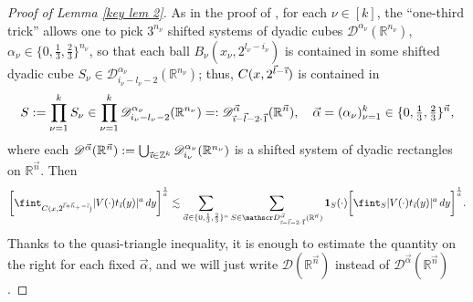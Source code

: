 \documentclass[11pt, reqno]{amsart}
\theoremstyle{definition}
\theoremstyle{remark}
\numberwithin{equation}{section}
\newcommand{\D}{\mathscr D}
\newcommand{\R}{\mathbb R}
\newcommand{\Z}{\mathbb Z}
\newcommand{\vone}{\vec 1}
\newcommand{\val}{\vec\alpha}
\newcommand{\vh}{\vec h}
\newcommand{\vi}{\vec{\textit{\i}}}
\newcommand{\vn}{\vec n}
\newcommand{\vl}{\vec l}
\newcommand{\one}{\mathbf{1}}
\newcommand{\abs}[1]{|#1|}
\begin{document}
\begin{proof}[Proof of Lemma \ref{key lem 2}]
As in the proof of \cite[Lemma 8.5]{BHYY:1b}, for each $\nu\in[k]$, the ``one-third trick'' \cite[Lemma 3.2.26]{HNVW1} allows one to pick $3^{n_{\nu}}$ shifted systems of dyadic cubes $\D^{\alpha_\nu}(\R^{n_\nu})$, $\alpha_\nu\in\{0,\frac13,\frac23\}^{n_\nu}$, so that each ball $B_{\nu}(x_\nu,2^{l_{\nu}-i_\nu})$ is contained in some shifted dyadic cube $S_{\nu}\in\D^{\alpha_\nu}_{i_\nu-l_{\nu}-2}(\R^{n_{\nu}})$; thus, $C(x,2^{\vl-\vi})$ is contained in
\begin{equation*}
S:=\prod_{\nu=1}^k S_{\nu}\in\prod_{\nu=1}^k \D^{\alpha_\nu}_{i_\nu-l_{\nu}-2}(\R^{n_{\nu}})
=:\D^{\val}_{\vi-\vl-2\cdot\vone}(\R^{\vn}),\quad
\val=(\alpha_\nu)_{\nu=1}^k\in\{0,\tfrac13,\tfrac23\}^{\vn},
\end{equation*}
where each $\D^{\val}(\R^{\vn}):=\bigcup_{\vi\in\Z^k}\D^{\alpha_\nu}_{i_\nu}(\R^{n_{\nu}})$ is a shifted system of dyadic rectangles on $\R^{\vn}$. Then
\begin{align*}
\bigg[\fint_{C(x,2^{\vl+\vh_+-\vi})}\abs{V(\cdot)t_{\vi}(y)}^a\, dy\bigg]^{\frac1a}
\lesssim\sum_{\val\in\{0,\frac13,\frac23\}^n}\sum_{S\in\D^{\val}_{\vi-\vl-2\cdot\vone}
(\R^{\vn})}\one_S(\cdot)
\bigg[\fint_{S}\abs{V(\cdot)t_{\vi}(y)}^a \, dy\bigg]^{\frac1a}.
\end{align*}
Thanks to the quasi-triangle inequality, it is enough to estimate the quantity on the right for each fixed $\val$, and we will just write $\D(\R^{\vn})$ instead of $\D^{\val}(\R^{\vn})$.


\end{proof}
\end{document}
